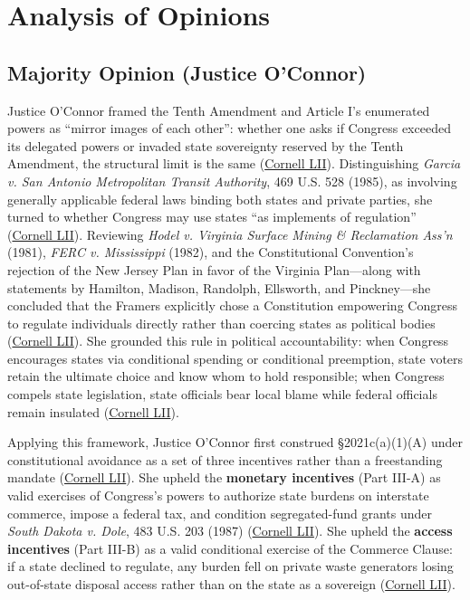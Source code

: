 \documentclass[12pt]{article}
\begin{document}
\section{Analysis of Opinions}

\subsection{Majority Opinion (Justice O'Connor)}

Justice O'Connor framed the Tenth Amendment and Article I's enumerated powers as ``mirror images of each other'': whether one asks if Congress exceeded its delegated powers or invaded state sovereignty reserved by the Tenth Amendment, the structural limit is the same (\href{https://www.law.cornell.edu/supremecourt/text/505/144}{Cornell LII}). Distinguishing \textit{Garcia v. San Antonio Metropolitan Transit Authority}, 469 U.S. 528 (1985), as involving generally applicable federal laws binding both states and private parties, she turned to whether Congress may use states ``as implements of regulation'' (\href{https://www.law.cornell.edu/supremecourt/text/505/144}{Cornell LII}). Reviewing \textit{Hodel v. Virginia Surface Mining \& Reclamation Ass'n} (1981), \textit{FERC v. Mississippi} (1982), and the Constitutional Convention's rejection of the New Jersey Plan in favor of the Virginia Plan---along with statements by Hamilton, Madison, Randolph, Ellsworth, and Pinckney---she concluded that the Framers explicitly chose a Constitution empowering Congress to regulate individuals directly rather than coercing states as political bodies (\href{https://www.law.cornell.edu/supremecourt/text/505/144}{Cornell LII}). She grounded this rule in political accountability: when Congress encourages states via conditional spending or conditional preemption, state voters retain the ultimate choice and know whom to hold responsible; when Congress compels state legislation, state officials bear local blame while federal officials remain insulated (\href{https://www.law.cornell.edu/supremecourt/text/505/144}{Cornell LII}).

Applying this framework, Justice O'Connor first construed \S 2021c(a)(1)(A) under constitutional avoidance as a set of three incentives rather than a freestanding mandate (\href{https://www.law.cornell.edu/supremecourt/text/505/144}{Cornell LII}). She upheld the \textbf{monetary incentives} (Part III-A) as valid exercises of Congress's powers to authorize state burdens on interstate commerce, impose a federal tax, and condition segregated-fund grants under \textit{South Dakota v. Dole}, 483 U.S. 203 (1987) (\href{https://www.law.cornell.edu/supremecourt/text/505/144}{Cornell LII}). She upheld the \textbf{access incentives} (Part III-B) as a valid conditional exercise of the Commerce Clause: if a state declined to regulate, any burden fell on private waste generators losing out-of-state disposal access rather than on the state as a sovereign (\href{https://www.law.cornell.edu/supremecourt/text/505/144}{Cornell LII}).
\end{document}
